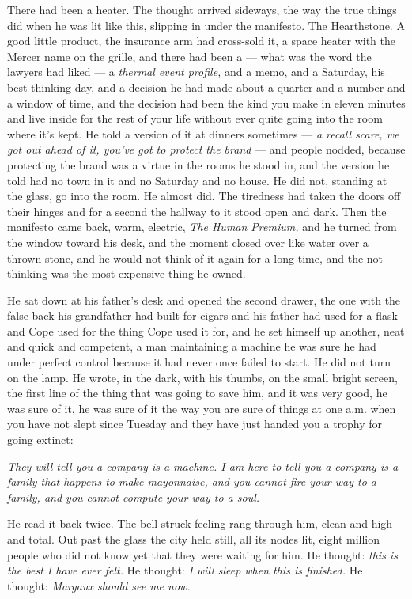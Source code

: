 \documentclass[11pt,openany]{book}
\begin{document}
There had been a heater. The thought arrived sideways, the way the true things did when he was lit like this, slipping in under the manifesto. The Hearthstone. A good little product, the insurance arm had cross-sold it, a space heater with the Mercer name on the grille, and there had been a --- what was the word the lawyers had liked --- a \textit{thermal event profile,} and a memo, and a Saturday, his best thinking day, and a decision he had made about a quarter and a number and a window of time, and the decision had been the kind you make in eleven minutes and live inside for the rest of your life without ever quite going into the room where it's kept. He told a version of it at dinners sometimes --- \textit{a recall scare, we got out ahead of it, you've got to protect the brand} --- and people nodded, because protecting the brand was a virtue in the rooms he stood in, and the version he told had no town in it and no Saturday and no house. He did not, standing at the glass, go into the room. He almost did. The tiredness had taken the doors off their hinges and for a second the hallway to it stood open and dark. Then the manifesto came back, warm, electric, \textit{The Human Premium,} and he turned from the window toward his desk, and the moment closed over like water over a thrown stone, and he would not think of it again for a long time, and the not-thinking was the most expensive thing he owned.

He sat down at his father's desk and opened the second drawer, the one with the false back his grandfather had built for cigars and his father had used for a flask and Cope used for the thing Cope used it for, and he set himself up another, neat and quick and competent, a man maintaining a machine he was sure he had under perfect control because it had never once failed to start. He did not turn on the lamp. He wrote, in the dark, with his thumbs, on the small bright screen, the first line of the thing that was going to save him, and it was very good, he was sure of it, he was sure of it the way you are sure of things at one a.m. when you have not slept since Tuesday and they have just handed you a trophy for going extinct:

\textit{They will tell you a company is a machine. I am here to tell you a company is a family that happens to make mayonnaise, and you cannot fire your way to a family, and you cannot compute your way to a soul.}

He read it back twice. The bell-struck feeling rang through him, clean and high and total. Out past the glass the city held still, all its nodes lit, eight million people who did not know yet that they were waiting for him. He thought: \textit{this is the best I have ever felt.} He thought: \textit{I will sleep when this is finished.} He thought: \textit{Margaux should see me now.}
\end{document}
